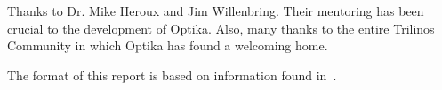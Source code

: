     Thanks to Dr. Mike Heroux and Jim Willenbring. Their mentoring
	has been crucial to the development of Optika. Also, many thanks
	to the entire Trilinos Community in which Optika has found a
	welcoming home.

    The format of this report is based on information found
    in~\cite{Sand98-0730}.
